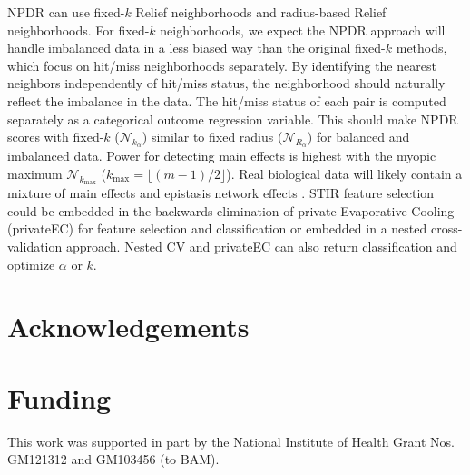 \documentclass[10pt]{article}
\begin{document}
NPDR can use fixed-$k$ Relief neighborhoods and radius-based Relief neighborhoods. For fixed-$k$ neighborhoods, we expect the NPDR approach will handle imbalanced data in a less biased way than the original fixed-$k$ methods, which focus on hit/miss neighborhoods separately. By identifying the nearest neighbors independently of hit/miss status, the neighborhood should naturally reflect the imbalance in the data. The hit/miss status of each pair is computed separately as a categorical outcome regression variable. This should make NPDR scores with fixed-$k$ ($\mathcal{N}_{k_\alpha}$) similar to fixed radius ($\mathcal{N}_{R_\alpha}$) for balanced and imbalanced data. Power for detecting main effects is highest with the myopic maximum $\mathcal{N}_{k_\text{max}}$ ($k_{\text{max}}=\lfloor (m-1)/2\rfloor$). Real biological data will likely contain a mixture of main effects and epistasis network effects \cite{mckinney_pajewski}. STIR feature selection could be embedded in the backwards elimination of private Evaporative Cooling (privateEC) for feature selection and classification \cite{le17} or embedded in a nested cross-validation approach. Nested CV and privateEC can also return classification and optimize $\alpha$ or $k$. 

\section*{Acknowledgements}

\section*{Funding}
This work was supported in part by the National Institute of Health Grant Nos. GM121312 and GM103456 (to BAM). 


\end{document}
